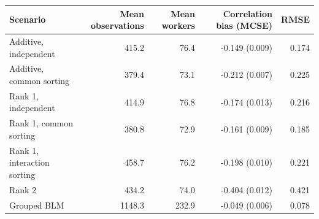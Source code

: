 \begin{tabular}{lrrrr}
\toprule
Scenario & Mean observations & Mean workers & Correlation bias (MCSE) & RMSE \\
\midrule
Additive, independent & 415.2 & 76.4 & -0.149 (0.009) & 0.174 \\
Additive, common sorting & 379.4 & 73.1 & -0.212 (0.007) & 0.225 \\
Rank 1, independent & 414.9 & 76.8 & -0.174 (0.013) & 0.216 \\
Rank 1, common sorting & 380.8 & 72.9 & -0.161 (0.009) & 0.185 \\
Rank 1, interaction sorting & 458.7 & 76.2 & -0.198 (0.010) & 0.221 \\
Rank 2 & 434.2 & 74.0 & -0.404 (0.012) & 0.421 \\
Grouped BLM & 1148.3 & 232.9 & -0.049 (0.006) & 0.078 \\
\bottomrule
\end{tabular}

